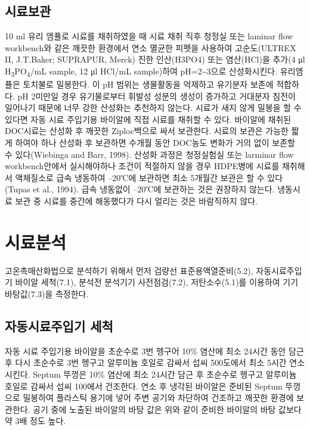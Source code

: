 \documentclass[
]{book}
\begin{document}
\hypertarget{uxc2dcuxb8ccuxbcf4uxad00-1}{%
\subsection{시료보관}\label{uxc2dcuxb8ccuxbcf4uxad00-1}}

10 ml 유리 앰퓰로 시료를 채취하였을 때 시료 채취 직후 청정실 또는 laminar flow workbench와 같은 깨끗한 환경에서 연소 멸균한 피펫을 사용하여 고순도(ULTREX II, J.T.Baker; SUPRAPUR, Merck) 진한 인산(H3PO4) 또는 염산(HCl)을 추가(4 μl H\textsubscript{3}PO\textsubscript{4}/mL sample, 12 μl HCl/mL sample)하여 pH=2\textasciitilde3으로 산성화시킨다. 유리앰퓰은 토치불로 밀봉한다. 이 pH 범위는 생물활동을 억제하고 유기분자 보존에 적합하다. pH 2미만일 경우 유기물로부터 휘발성 성분의 생성이 증가하고 거대분자 침전이 일어나기 때문에 너무 강한 산성화는 추천하지 않는다. 시료가 새지 않게 밀봉을 할 수 있다면 자동 시료 주입기용 바이알에 직접 시료를 채취할 수 있다. 바이알에 채취된 DOC시료는 산성화 후 깨끗한 Ziploc백으로 싸서 보관한다. 시료의 보관은 가능한 짧게 하여야 하나 산성화 후 보관하면 수개월 동안 DOC농도 변화가 거의 없이 보존할 수 있다(Wiebinga and Barr, 1998).
산성화 과정은 청정실험실 또는 larminar flow workbench안에서 실시해야하나 조건이 적절하지 않을 경우 HDPE병에 시료를 채취해서 액체질소로 급속 냉동하여 --20℃에 보관하면 최소 5개월간 보관은 할 수 있다(Tupas et al., 1994). 급속 냉동없이 --20℃에 보관하는 것은 권장하지 않는다. 냉동시료 보관 중 시료를 중간에 해동했다가 다시 얼리는 것은 바람직하지 않다.

\hypertarget{uxc2dcuxb8ccuxbd84uxc11d-3}{%
\section{시료분석}\label{uxc2dcuxb8ccuxbd84uxc11d-3}}

고온촉매산화법으로 분석하기 위해서 먼저 검량선 표준용액열준비(5.2), 자동시료주입기 바이알 세척(7.1), 분석전 분석기기 사전점검(7.2), 저탄소수(5.1)를 이용하여 기기 바탕값(7.3)을 측정한다.

\hypertarget{uxc790uxb3d9uxc2dcuxb8ccuxc8fcuxc785uxae30-uxc138uxcc99}{%
\subsection{자동시료주입기 세척}\label{uxc790uxb3d9uxc2dcuxb8ccuxc8fcuxc785uxae30-uxc138uxcc99}}

자동 시료 주입기용 바이알을 초순수로 3번 헹구어 10\% 염산에 최소 24시간 동안 담근 후 다시 초순수로 3번 헹구고 알루미늄 호일로 감싸서 섭씨 500도에서 최소 5시간 연소시킨다. Septum 뚜껑은 10\% 염산에 최소 24시간 담근 후 초순수로 헹구고 알루미늄 호일로 감싸서 섭씨 100에서 건조한다.
연소 후 냉각된 바이알은 준비된 Septum 뚜껑으로 밀봉하여 플라스틱 용기에 넣어 주변 공기와 차단하여 건조하고 깨끗한 환경에 보관한다. 공기 중에 노출된 바이알의 바탕 값은 위와 같이 준비한 바이알의 바탕 값보다 약 3배 정도 높다.
\end{document}
